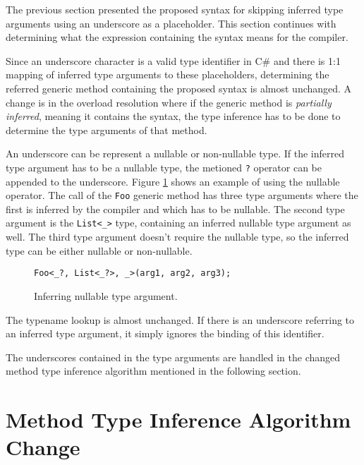 The previous section presented the proposed syntax for skipping inferred type arguments using an underscore as a placeholder. 
This section continues with determining what the expression containing the syntax means for the compiler.
\par
Since an underscore character is a valid type identifier in C\# and there is
1:1 mapping of inferred type arguments to these placeholders, determining the referred generic method containing the proposed syntax is almost unchanged. 
A change is in the overload resolution where if the generic method is \textit{partially inferred}, meaning it contains the syntax, the type inference has to be done to determine the type arguments of that method.
\par
An underscore can be represent a nullable or non-nullable type. 
If the inferred type argument has to be a nullable type, the metioned \texttt{?} operator can be appended to the underscore. 
Figure \ref{img53:null} shows an example of using the nullable operator. 
The call of the \texttt{Foo} generic method has three type arguments where the first is inferred by the compiler and which has to be nullable. 
The second type argument is the \texttt{List<\_>} type, containing an inferred nullable type argument as well. 
The third type argument doesn’t require the nullable type, so the inferred type can be either nullable or non-nullable.
\begin{figure}[h!]
\begin{lstlisting}[style=csharp]
Foo<_?, List<_?>, _>(arg1, arg2, arg3);
\end{lstlisting}
\caption{Inferring nullable type argument.}
\label{img53:null}
\end{figure}
\par
The typename lookup is almost unchanged. 
If there is an underscore referring to an inferred type argument, it simply ignores the binding of this identifier.
\par
The underscores contained in the type arguments are handled in the changed method type inference algorithm mentioned in the following section.

\section{Method Type Inference Algorithm Change}

